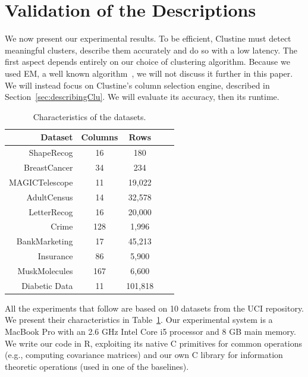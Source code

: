\section{Validation of the Descriptions}
\label{sec:eval}
We now present our experimental results. To be efficient, Clustine must detect
meaningful clusters, describe them accurately and do so with a low latency.
The first aspect depends entirely on our choice of clustering algorithm.
Because we used EM, a well known algorithm~\cite{bishop2001bishop}, we will not
discuss it further in this paper. We will instead focus on  Clustine's column
selection engine, described in Section~\ref{sec:describingClu}. We will
evaluate its accuracy, then its runtime.

\begin{table}[!t]
    \centering
    \small
    \begin{tabular}{r c c c c} 
        \hline
        Dataset & Columns & Rows\\
        \hline
        ShapeRecog & 16 & 180\\
        BreastCancer & 34 & 234\\
        MAGICTelescope & 11 & 19,022\\
        AdultCensus & 14 & 32,578\\
        LetterRecog & 16 & 20,000\\
        Crime & 128 & 1,996\\
        BankMarketing & 17 & 45,213\\
        Insurance & 86 & 5,900\\
        MuskMolecules & 167 & 6,600\\
        Diabetic Data & 11 & 101,818\\
        \hline
    \end{tabular}
    \caption{Characteristics of the datasets.}
    \label{tab:datasets}
\end{table}

All the experiments that follow are based on 10 datasets from the UCI
repository. We present their characteristics in Table~\ref{tab:datasets}. Our
experimental system is a MacBook Pro with an 2.6 GHz Intel Core i5 processor
and 8 GB main memory. We write our code in R, exploiting its native C
primitives for common operations (e.g., computing covariance matrices) and our
own C library for information theoretic operations (used in one of the
baselines).

